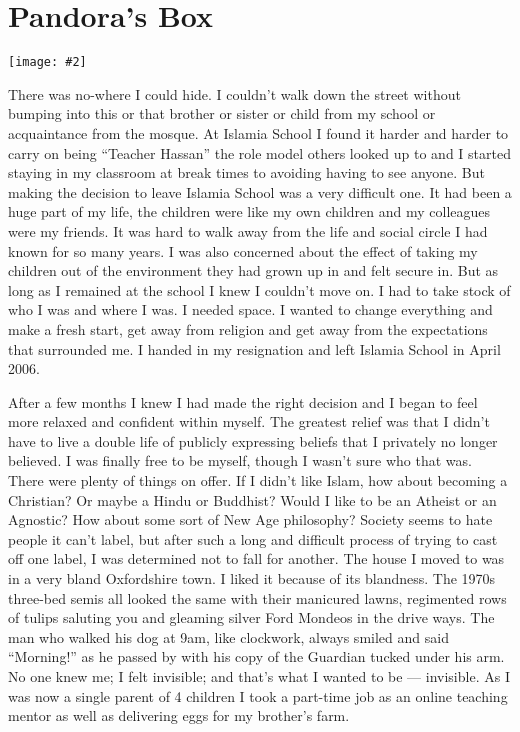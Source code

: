 \documentclass[12pt]{memoir}
\newcommand{\img}[3]{\begin{center}%
\texttt{[image: \#2]}\\{\small\em#3}%
\end{center}}
\begin{document}
\chapter{Pandora’s Box}

\img{scale=0.5}{Pandoras_Box.jpg}{}

There was no-where I could hide.
I couldn’t walk down the street without bumping into this or that brother
or sister or child from my school or acquaintance from the mosque.
At Islamia School I found it harder and harder to carry on
being “Teacher Hassan” the role model others looked up to
and I started staying in my classroom at break times
to avoiding having to see anyone.
But making the decision to leave Islamia School was a very difficult one.
It had been a huge part of my life, the children were like my own children
and my colleagues were my friends.
It was hard to walk away from the life and social circle
I had known for so many years.
I was also concerned about the effect of taking my children
out of the environment they had grown up in and felt secure in.
But as long as I remained at the school I knew I couldn’t move on.
I had to take stock of who I was and where I was.
I needed space.
I wanted to change everything and make a fresh start,
get away from religion and get away from the expectations that surrounded me.
I handed in my resignation and left Islamia School in April 2006.

After a few months I knew I had made the right decision
and I began to feel more relaxed and confident within myself.
The greatest relief was that I didn’t have to live a double life
of publicly expressing beliefs that I privately no longer believed.
I was finally free to be myself, though I wasn’t sure who that was.
There were plenty of things on offer.
If I didn’t like Islam, how about becoming a Christian?
Or maybe a Hindu or Buddhist?
Would I like to be an Atheist or an Agnostic?
How about some sort of New Age philosophy?
Society seems to hate people it can’t label,
but after such a long and difficult process of trying to cast off one label,
I was determined not to fall for another.
The house I moved to was in a very bland Oxfordshire town.
I liked it because of its blandness.
The 1970s three-bed semis all looked the same with their manicured lawns,
regimented rows of tulips saluting you
and gleaming silver Ford Mondeos in the drive ways.
The man who walked his dog at 9am, like clockwork, always smiled
and said “Morning!” as he passed by with his copy
of the Guardian tucked under his arm.
No one knew me; I felt invisible; and that’s what I wanted to be — invisible.
As I was now a single parent of 4 children I took a part-time job
as an online teaching mentor as well as delivering eggs for my brother’s farm.
\end{document}
